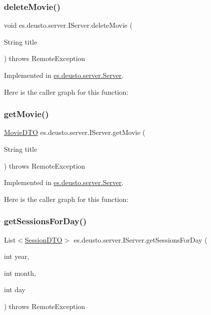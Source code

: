 \subsubsection{\texorpdfstring{deleteMovie()}{deleteMovie()}}
{\footnotesize\ttfamily void es.\+deusto.\+server.\+I\+Server.\+delete\+Movie (\begin{DoxyParamCaption}\item[{String}]{title }\end{DoxyParamCaption}) throws Remote\+Exception}



Implemented in \mbox{\hyperlink{classes_1_1deusto_1_1server_1_1_server_a6501e4103fcc2ef691c15e4e02f7136c}{es.\+deusto.\+server.\+Server}}.

Here is the caller graph for this function\+:
\mbox{\label{interfacees_1_1deusto_1_1server_1_1_i_server_a2b7883e416d98a7c92de13cbed7af450}} 
\subsubsection{\texorpdfstring{getMovie()}{getMovie()}}
{\footnotesize\ttfamily \mbox{\hyperlink{classes_1_1deusto_1_1server_1_1data_1_1_movie_d_t_o}{Movie\+D\+TO}} es.\+deusto.\+server.\+I\+Server.\+get\+Movie (\begin{DoxyParamCaption}\item[{String}]{title }\end{DoxyParamCaption}) throws Remote\+Exception}



Implemented in \mbox{\hyperlink{classes_1_1deusto_1_1server_1_1_server_a7e4544c63bcf2b2d3abce0d2ff1567ac}{es.\+deusto.\+server.\+Server}}.

Here is the caller graph for this function\+:
\mbox{\label{interfacees_1_1deusto_1_1server_1_1_i_server_aac50d6a77e30df4d4c15fcaf4ba979f5}} 
\subsubsection{\texorpdfstring{getSessionsForDay()}{getSessionsForDay()}}
{\footnotesize\ttfamily List$<$\mbox{\hyperlink{classes_1_1deusto_1_1server_1_1data_1_1_session_d_t_o}{Session\+D\+TO}}$>$ es.\+deusto.\+server.\+I\+Server.\+get\+Sessions\+For\+Day (\begin{DoxyParamCaption}\item[{int}]{year,  }\item[{int}]{month,  }\item[{int}]{day }\end{DoxyParamCaption}) throws Remote\+Exception}



